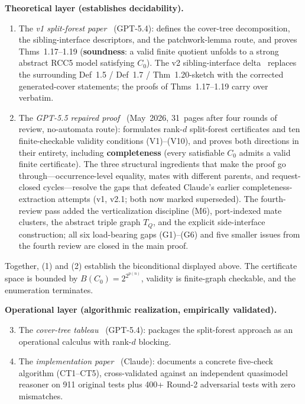 \documentclass[
]{ceurart}
\theoremstyle{definition}
\begin{document}
\medskip\noindent\textbf{Theoretical layer (establishes
decidability).}
\begin{enumerate}
  \item The \emph{v1 split-forest paper}~\cite{SiblingCompleted}
    (GPT-5.4): defines the cover-tree decomposition, the
    sibling-interface descriptors, and the patchwork-lemma route,
    and proves Thms~1.17--1.19 (\textbf{soundness}: a valid
    finite quotient unfolds to a strong abstract RCC5 model
    satisfying $C_0$).  The v2 sibling-interface
    delta~\cite{SiblingInterfaceV2} replaces the surrounding
    Def~1.5 / Def~1.7 / Thm~1.20-sketch with the corrected
    generated-cover statements; the proofs of Thms~1.17--1.19
    carry over verbatim.
  \item The \emph{GPT-5.5 repaired
    proof}~\cite{GPT55Repaired} (May~2026, 31~pages after four
    rounds of review, no-automata route): formulates rank-$d$
    split-forest certificates and ten finite-checkable validity
    conditions (V1)--(V10), and proves both directions in their
    entirety, including \textbf{completeness} (every satisfiable
    $C_0$ admits a valid finite certificate).  The three
    structural ingredients that make the proof go
    through---occurrence-level equality, mates with different
    parents, and request-closed cycles---resolve the gaps that
    defeated Claude's earlier completeness-extraction attempts
    (v1, v2.1; both now marked superseded).  The fourth-review
    pass added the verticalization discipline (M6), port-indexed
    mate clusters, the abstract triple graph $T_Q$, and the
    explicit side-interface construction; all six load-bearing
    gaps (G1)--(G6) and five smaller issues from the fourth
    review are closed in the main proof.
\end{enumerate}
Together, (1) and (2) establish the biconditional displayed
above.  The certificate space is bounded by
$B(C_0) = 2^{2^{p(n)}}$, validity is finite-graph checkable, and
the enumeration terminates.

\medskip\noindent\textbf{Operational layer (algorithmic
realization, empirically validated).}
\begin{enumerate}\setcounter{enumi}{2}
  \item The \emph{cover-tree tableau}~\cite{CoverTree} (GPT-5.4):
    packages the split-forest approach as an operational calculus
    with rank-$d$ blocking.
  \item The \emph{implementation paper}~\cite{CoverTreeImpl}
    (Claude): documents a concrete five-check algorithm (CT1--CT5),
    cross-validated against an independent quasimodel reasoner on
    911 original tests plus 400+ Round-2 adversarial tests with
    zero mismatches.
\end{enumerate}
\end{document}
